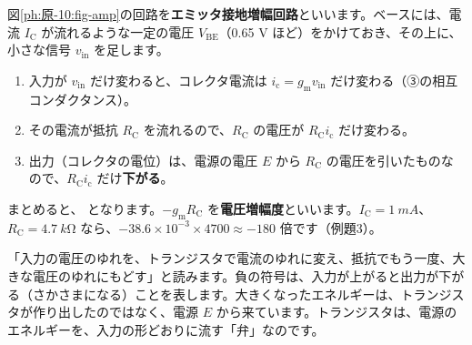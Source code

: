 \noindent 図\ref{ph:原-10:fig-amp}の回路を\textbf{エミッタ接地増幅回路}といいます。ベースには、電流 $I_{\mathrm C}$ が流れるような一定の電圧 $V_{\mathrm{BE}}$（0.65 V ほど）をかけておき、その上に、小さな信号 $v_{\mathrm{in}}$ を足します。
\begin{enumerate}[label={\bkcircled{\arabic*}}, leftmargin=2.4\zw, itemsep=1pt, topsep=2pt]
\item 入力が $v_{\mathrm{in}}$ だけ変わると、コレクタ電流は $i_{\mathrm c}=g_{\mathrm m}v_{\mathrm{in}}$ だけ変わる（③の相互コンダクタンス）。
\item その電流が抵抗 $R_{\mathrm C}$ を流れるので、$R_{\mathrm C}$ の電圧が $R_{\mathrm C}i_{\mathrm c}$ だけ変わる。
\item 出力（コレクタの電位）は、電源の電圧 $E$ から $R_{\mathrm C}$ の電圧を引いたものなので、$R_{\mathrm C}i_{\mathrm c}$ だけ\textbf{下がる}。
\end{enumerate}
まとめると、
\label{ph:原-10:gain}となります。$-g_{\mathrm m}R_{\mathrm C}$ を\textbf{電圧増幅度}といいます。$I_{\mathrm C}=\qty{1}{mA}$、$R_{\mathrm C}=\qty{4.7}{k\ohm}$ なら、$-38.6\times10^{-3}\times4700\approx-180$ 倍です（例題3）。

\begin{phyomi}[$v_{\mathrm{out}}=-g_{\mathrm m}R_{\mathrm C}v_{\mathrm{in}}$]
「入力の電圧のゆれを、トランジスタで電流のゆれに変え、抵抗でもう一度、大きな電圧のゆれにもどす」と読みます。負の符号は、入力が上がると出力が下がる（さかさまになる）ことを表します。大きくなったエネルギーは、トランジスタが作り出したのではなく、電源 $E$ から来ています。トランジスタは、電源のエネルギーを、入力の形どおりに流す「弁」なのです。
\end{phyomi}

\begin{phmodel}[小さな信号の増幅]
\end{phmodel}

